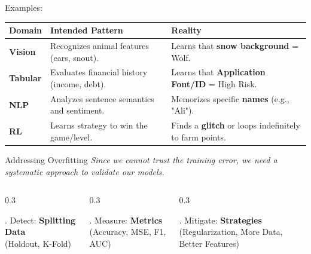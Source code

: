 \begin{frame}{Examples:}
    \centering
    \small    
    \begin{table}[]
        \centering
        \renewcommand{\arraystretch}{1.4} 
        \begin{tabular}{l p{4.0cm} p{4.5cm}}
            \hline
            \textbf{Domain} & \textbf{Intended Pattern} & \textbf{Reality} \\ \hline
            \textbf{Vision} & Recognizes animal features (ears, snout). & Learns that \textbf{snow background} = Wolf. \\ 
            \textbf{Tabular} & Evaluates financial history (income, debt). & Learns that \textbf{Application Font/ID} = High Risk. \\ 
            \textbf{NLP} & Analyzes sentence semantics and sentiment. & Memorizes specific \textbf{names} (e.g., "Ali"). \\ 
            \textbf{RL} & Learns strategy to win the game/level. & Finds a \textbf{glitch} or loops indefinitely to farm points. \\ \hline
        \end{tabular}
    \end{table}
\end{frame}


\begin{frame}{Addressing Overfitting}
    \centering
    \large \textit{Since we cannot trust the training error, we need a systematic approach to validate our models.}
    
    \vspace{0.8cm}
    
    \begin{columns}[T]
        \begin{column}{0.3\textwidth}
            \begin{block}{. Detect:}
                \centering
                \textbf{Splitting Data}\\
                (Holdout, K-Fold)
            \end{block}
        \end{column}
        \begin{column}{0.3\textwidth}
            \begin{block}{. Measure:}
                \centering
                \textbf{Metrics}\\
                (Accuracy, MSE, F1, AUC)
            \end{block}
        \end{column}
        \begin{column}{0.3\textwidth}
            \begin{block}{. Mitigate:}
                \centering
                \textbf{Strategies}\\
                (Regularization, More Data, Better Features)
            \end{block}
        \end{column}
    \end{columns}
\end{frame}

